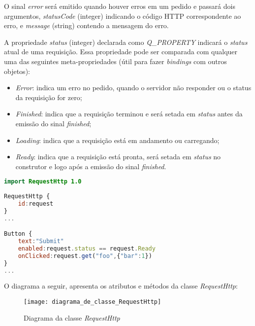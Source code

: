 O sinal \textit{error} será emitido quando houver erros em um pedido e passará dois argumentos, \textit{statusCode} (integer) indicando o código HTTP correspondente ao erro, e \textit{message} (string) contendo a mensagem do erro.\par

A propriedade \textit{status} (integer) declarada como \textit{Q\_PROPERTY} indicará o \textit{status} atual de uma requisição. Essa propriedade pode ser comparada com qualquer uma das seguintes meta-propriedades (útil para fazer \textit{bindings} com outros objetos):

\begin{itemize}
	\item \textit{Error}: indica um erro no pedido, quando o servidor não responder ou o status da requisição for zero;

	\item \textit{Finished}: indica que a requisição terminou e será setada em \textit{status} antes da emissão do sinal \textit{finished};

	\item \textit{Loading}: indica que a requisição está em andamento ou carregando;

	\item \textit{Ready}: indica que a requisição está pronta, será setada em \textit{status} no construtor e logo após a emissão do sinal \textit{finished}.
\end{itemize}

\begin{center}
\begin{lstlisting}[language=qml]
import RequestHttp 1.0 
	
RequestHttp {
	id:request
}
...

Button {
	text:"Submit"
	enabled:request.status == request.Ready
	onClicked:request.get("foo",{"bar":1})
}
...
\end{lstlisting}
\end{center}


O diagrama a seguir, apresenta os atributos e métodos da classe \textit{RequestHttp}:

\begin{figure}[h]
	\texttt{[image: diagrama\_de\_classe\_RequestHttp]}
	\centering
	\caption{Diagrama da classe \textit{RequestHttp}}
\end{figure}


